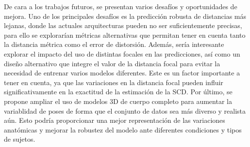 De cara a los trabajos futuros, se presentan varios desafíos y oportunidades de mejora. Uno de los principales desafíos es la predicción robusta de distancias más lejanas, donde las actuales arquitecturas pueden no ser suficientemente precisas, para ello se explorarían métricas alternativas que permitan tener en cuenta tanto la distancia métrica como el error de distorsión. Además, sería interesante explorar el impacto del uso de distintas focales en las predicciones, así como un diseño alternativo que integre el valor de la distancia focal para evitar la necesidad de entrenar varios modelos diferentes. Este es un factor importante a tener en cuenta, ya que las variaciones en la distancia focal pueden influir significativamente en la exactitud de la estimación de la SCD. Por último, se propone ampliar el uso de modelos 3D de cuerpo completo para aumentar la variablidad de poses de forma que el conjunto de datos sea más diverso y realista aún. Esto podría proporcionar una mejor representación de las variaciones anatómicas y mejorar la robustez del modelo ante diferentes condiciones y tipos de sujetos.
